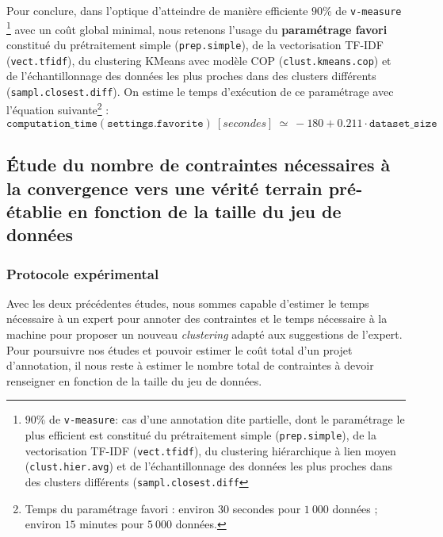 			Pour conclure, dans l'optique d'atteindre de manière efficiente $90$\% de \texttt{v-measure}
			\footnote{$90$\% de \texttt{v-measure}: cas d'une annotation dite partielle, dont le paramétrage le plus efficient est constitué du prétraitement simple (\texttt{prep.simple}), de la vectorisation TF-IDF (\texttt{vect.tfidf}), du clustering hiérarchique à lien moyen (\texttt{clust.hier.avg}) et de l'échantillonnage des données les plus proches dans des clusters différents (\texttt{sampl.closest.diff}}
			avec un coût global minimal, nous retenons l'usage du \textbf{paramétrage favori} constitué du prétraitement simple (\texttt{prep.simple}), de la vectorisation TF-IDF (\texttt{vect.tfidf}), du clustering KMeans avec modèle COP (\texttt{clust.kmeans.cop}) et de l'échantillonnage des données les plus proches dans des clusters différents (\texttt{sampl.closest.diff}).
			On estime le temps d'exécution de ce paramétrage avec l'équation suivante\footnote{Temps du paramétrage favori : environ $30$ secondes pour $1~000$ données ; environ $15$ minutes pour $5~000$ données.} :
			\begin{equation}
				\label{equation:4.3.2-ETUDE-COUTS-TEMPS-CALCUL-PARAMETRAGE-FAVORI}
				\texttt{computation\_time}(\texttt{settings.favorite})~[secondes]~
				\simeq~-180 + 0.211 \cdot \texttt{dataset\_size}
			\end{equation}
	
	\subsection{Étude du nombre de contraintes nécessaires à la convergence vers une vérité terrain pré-établie en fonction de la taille du jeu de données}
	\label{section:4.3.3-ETUDE-COUT-NOMBRE-CONTRAINTES}
	
		\subsubsection{Protocole expérimental}
			
			Avec les deux précédentes études, nous sommes capable d'estimer le temps nécessaire à un expert pour annoter des contraintes et le temps nécessaire à la machine pour proposer un nouveau \textit{clustering} adapté aux suggestions de l'expert.
			Pour poursuivre nos études et pouvoir estimer le coût total d'un projet d'annotation, il nous reste à estimer le nombre total de contraintes à devoir renseigner en fonction de la taille du jeu de données.
			
